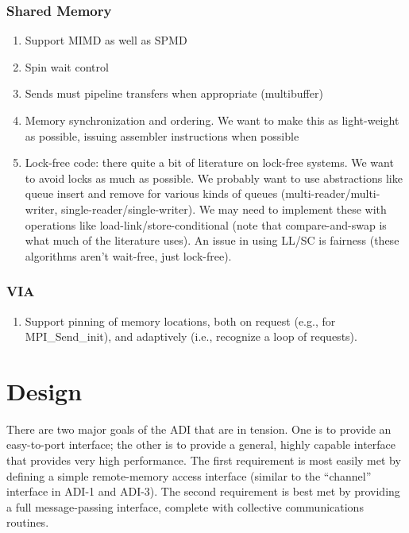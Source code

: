 \documentclass{article}
\begin{document}
\subsubsection{Shared Memory}
\begin{enumerate}
\item Support MIMD as well as SPMD
\item Spin wait control
\item Sends must pipeline transfers when appropriate (multibuffer)
\item Memory synchronization and ordering.  We want to make this as
  light-weight as possible, issuing assembler instructions when possible
\item Lock-free code: there quite a bit of literature on lock-free systems.
  We want to avoid locks as much as possible.  We probably want to use
  abstractions like queue insert and remove for various kinds of queues
  (multi-reader/multi-writer, single-reader/single-writer).  We may need to
  implement these with operations like load-link/store-conditional (note that
  compare-and-swap is what much of the literature uses).  An issue in using
  LL/SC is fairness (these algorithms aren't wait-free, just lock-free).
\end{enumerate}

\subsubsection{VIA}
\begin{enumerate}
\item Support pinning of memory locations, both on request (e.g., for
  MPI\_Send\_init), and adaptively (i.e., recognize a loop of requests).
\end{enumerate}


\section{Design}
\label{sec:design}


There are two major goals of the ADI that are in tension.  One is to provide
an easy-to-port interface; the other is to provide a general, highly capable
interface that provides very high performance.  The first requirement is most
easily met by defining a simple remote-memory access interface (similar to the
``channel'' interface in ADI-1 and ADI-3).  The second requirement is best met
by providing a full message-passing interface, complete with collective
communications routines.  
\end{document}
